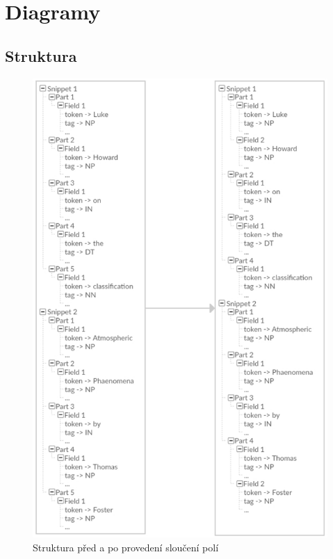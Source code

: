 \chapter{Diagramy}
\section{Struktura \emph{}}

\begin{figure}[!ht]
	\includegraphics[scale=0.53]{obrazky-figures/SnippetsPartsFields.png}
	\caption{Struktura \emph{} před a po provedení sloučení polí}
    \label{SnippetsPartsFieldsLbl}
\end{figure}

